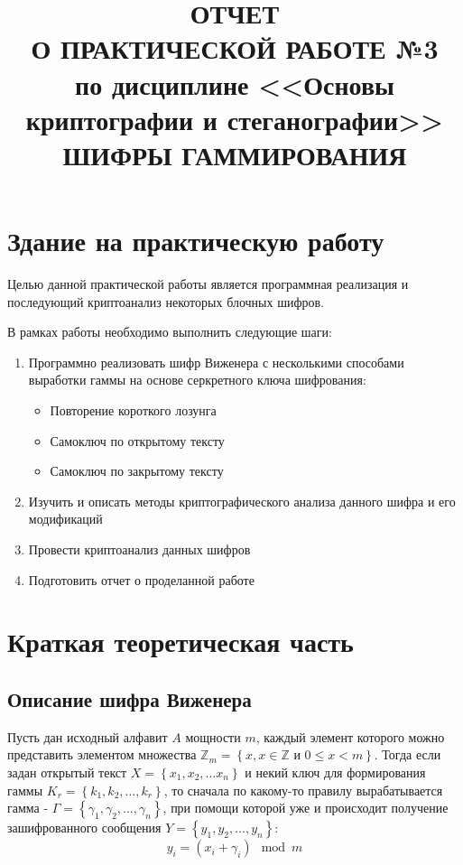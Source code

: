 \documentclass[a4paper]{article}
\title{
  ОТЧЕТ \\
  О ПРАКТИЧЕСКОЙ РАБОТЕ №3 \\
  по дисциплине <<Основы криптографии и стеганографии>> \\
  ШИФРЫ ГАММИРОВАНИЯ
}
\begin{document}
  \templatedtitlepage
  
  \toc

  \section{Здание на практическую работу}

  Целью данной практической работы является программная реализация и последующий 
  криптоанализ некоторых блочных шифров.

  В рамках работы необходимо выполнить следующие шаги:

  \begin{enumerate}
    \setlength{\itemindent}{1cm}
    \item {
        Программно реализовать шифр Виженера с несколькими способами выработки
        гаммы на основе серкретного ключа шифрования:

        \begin{itemize}
            \setlength{\itemindent}{1cm}
            \item Повторение короткого лозунга
            \item Самоключ по открытому тексту
            \item Самоключ по закрытому тексту
        \end{itemize}
    }
    \item {
        Изучить и описать методы криптографического анализа данного шифра и его модификаций 
    }
    \item {
        Провести криптоанализ данных шифров
    }
    \item {
        Подготовить отчет о проделанной работе
    }
  \end{enumerate}

  \newpage
  \section{Краткая теоретическая часть}

  \subsection{Описание шифра Виженера}

  Пусть дан исходный алфавит $A$ мощности $m$, каждый элемент которого
  можно представить элементом множества $\mathbb{Z}_m = \left\{x, x \in \mathbb{Z} \text{ и } 0 \leq x < m \right\}$.
  Тогда если задан открытый текст $X = \left\{x_1, x_2, \dots x_n\right\}$ и некий ключ
  для формирования гаммы $K_r = \left\{k_1, k_2, \dots, k_r\right\}$, то сначала
  по какому-то правилу вырабатывается гамма - $\Gamma = \left\{\gamma_1, \gamma_2, \dots, \gamma_n\right\}$, при помощи которой
  уже и происходит получение зашифрованного сообщения $Y = \left\{y_1, y_2, \dots, y_n\right\}$:
  \begin{equation}
    y_i = (x_i + \gamma_i) \mod m
  \end{equation}
\end{document}
